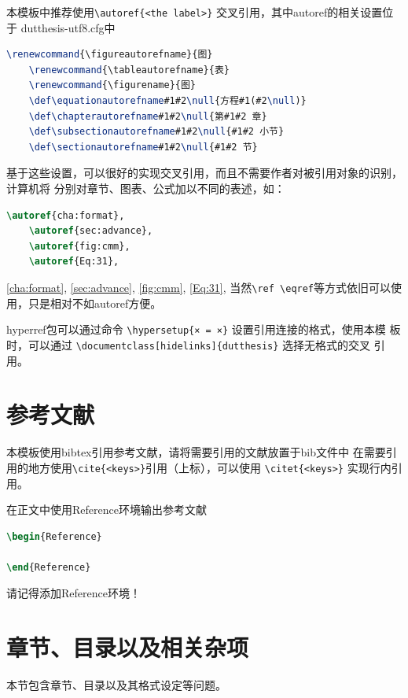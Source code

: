 本模板中推荐使用\verb|\autoref{<the label>}| 交叉引用，其中autoref的相关设置位于
dutthesis-utf8.cfg中
\begin{lstlisting}[language=TeX]
    \renewcommand{\figureautorefname}{图}
    \renewcommand{\tableautorefname}{表}
    \renewcommand{\figurename}{图}
    \def\equationautorefname#1#2\null{方程#1(#2\null)}
    \def\chapterautorefname#1#2\null{第#1#2 章}
    \def\subsectionautorefname#1#2\null{#1#2 小节}
    \def\sectionautorefname#1#2\null{#1#2 节}
\end{lstlisting}
基于这些设置，可以很好的实现交叉引用，而且不需要作者对被引用对象的识别，计算机将
分别对章节、图表、公式加以不同的表述，如：
\begin{lstlisting}[language=TeX]
    \autoref{cha:format},
    \autoref{sec:advance},
    \autoref{fig:cmm},
    \autoref{Eq:31},
\end{lstlisting}
\autoref{cha:format},
\autoref{sec:advance},
\autoref{fig:cmm},
\autoref{Eq:31},
当然\verb|\ref \eqref|等方式依旧可以使用，只是相对不如autoref方便。

hyperref包可以通过命令 \verb|\hypersetup{× = ×}| 设置引用连接的格式，使用本模
板时，可以通过 \verb|\documentclass[hidelinks]{dutthesis}| 选择无格式的交叉
引用。

\section{参考文献}
\label{sec:reference}
本模板使用bibtex引用参考文献，请将需要引用的文献放置于bib文件中
在需要引用的地方使用\verb|\cite{<keys>}|引用（上标），可以使用
\verb|\citet{<keys>}| 实现行内引用。

在正文中使用Reference环境输出参考文献
\begin{lstlisting}[language=TeX]
\begin{Reference}

\end{Reference}
\end{lstlisting}
请记得添加Reference环境！

\section{章节、目录以及相关杂项}
\label{sec:Chapter-section-contents-others}
本节包含章节、目录以及其格式设定等问题。
